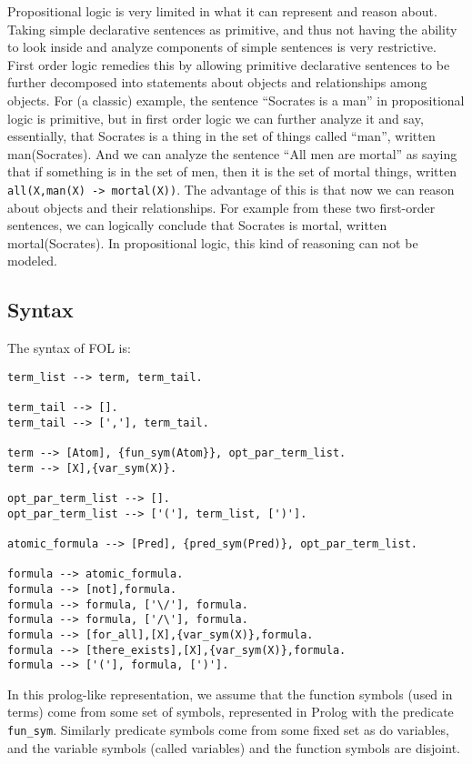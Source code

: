 Propositional logic is very limited in what it can represent and
reason about.  Taking simple declarative sentences as primitive, and
thus not having the ability to look inside and analyze components of
simple sentences is very restrictive.  First order logic remedies this
by allowing primitive declarative sentences to be further decomposed
into statements about objects and relationships among objects.  For
(a classic) example, the sentence ``Socrates is a man'' in
propositional logic is primitive, but in first order logic we can
further analyze it and say, essentially, that Socrates is a thing in
the set of things called ``man'', written man(Socrates).  And we can
analyze the sentence ``All men are mortal'' as saying that if
something is in the set of men, then it is the set of mortal things,
written \verb|all(X,man(X) -> mortal(X))|.  The advantage of this is
that now we can reason about objects and their relationships.  For
example from these two first-order sentences, we can logically
conclude that Socrates is mortal, written mortal(Socrates).  In
propositional logic, this kind of reasoning can not be modeled.

\subsection{Syntax}

The syntax of FOL is:
\begin{verbatim}
term_list --> term, term_tail.

term_tail --> [].
term_tail --> [','], term_tail.

term --> [Atom], {fun_sym(Atom}}, opt_par_term_list.
term --> [X],{var_sym(X)}.

opt_par_term_list --> [].
opt_par_term_list --> ['('], term_list, [')'].

atomic_formula --> [Pred], {pred_sym(Pred)}, opt_par_term_list.

formula --> atomic_formula.
formula --> [not],formula.
formula --> formula, ['\/'], formula.
formula --> formula, ['/\'], formula.
formula --> [for_all],[X],{var_sym(X)},formula.
formula --> [there_exists],[X],{var_sym(X)},formula.
formula --> ['('], formula, [')'].
\end{verbatim}

In this prolog-like representation, we assume that the function
symbols (used in terms) come from some set of symbols, represented in
Prolog with the predicate \verb|fun_sym|.  Similarly predicate symbols
come from some fixed set as do variables, and the variable symbols
(called variables) and the function symbols are disjoint.

